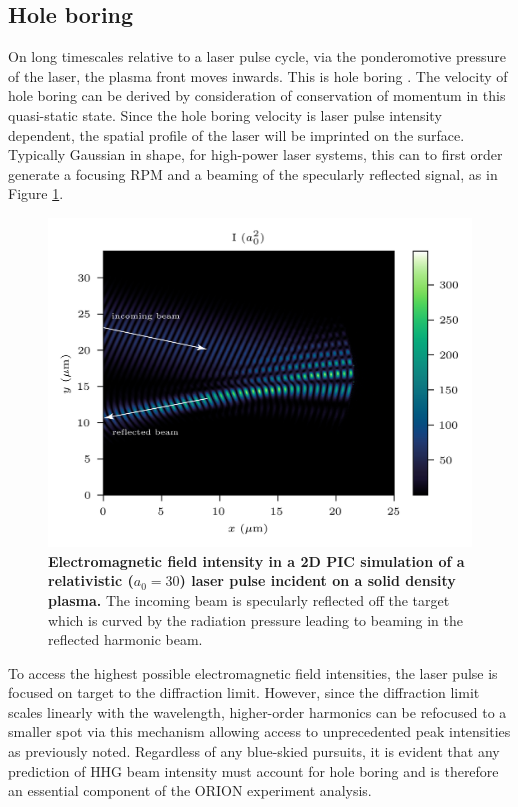 \subsection{Hole boring}
On long timescales relative to a laser pulse cycle, via the ponderomotive pressure of the laser, the plasma front moves inwards. This is hole boring \cite{wilksAbsorptionUltraIntenseLaser1992}. The velocity of hole boring can be derived by consideration of conservation of momentum in this quasi-static state. Since the hole boring velocity is laser pulse intensity dependent, the spatial profile of the laser will be imprinted on the surface. Typically Gaussian in shape, for high-power laser systems, this can to first order generate a focusing \ac{RPM} and a beaming of the specularly reflected signal, as in Figure \ref{fig:orionholeboring}.
\begin{figure}
	\centering
	\includegraphics[width=0.9\linewidth]{figures/orion/orion_hole_boring}
	\caption[2D PIC simulation of HHG beaming effect via hole boring.]{\textbf{Electromagnetic field intensity in a 2D PIC simulation of a relativistic ($a_0 = 30$) laser pulse incident on a solid density plasma.} The incoming beam is specularly reflected off the target which is curved by the radiation pressure leading to beaming in the reflected harmonic beam.}
	\label{fig:orionholeboring}
\end{figure}
To access the highest possible electromagnetic field intensities, the laser pulse is focused on target to the diffraction limit. However, since the diffraction limit scales linearly with the wavelength, higher-order harmonics can be refocused to a smaller spot via this mechanism allowing access to unprecedented peak intensities as previously noted. Regardless of any blue-skied pursuits, it is evident that any prediction of \ac{HHG} beam intensity must account for hole boring and is therefore an essential component of the ORION experiment analysis.

